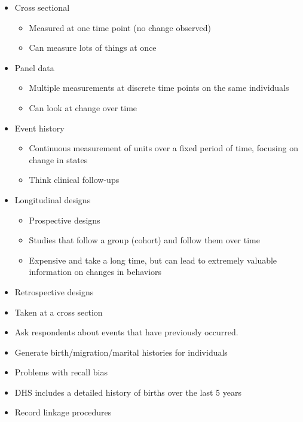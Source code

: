 \documentclass[
  letterpaper,
  DIV=11,
  numbers=noendperiod]{scrreprt}
\providecommand{\tightlist}{%
  \setlength{\itemsep}{0pt}\setlength{\parskip}{0pt}}\usepackage{longtable,booktabs,array}
\begin{document}
\begin{itemize}
\item
  Cross sectional

  \begin{itemize}
  \tightlist
  \item
    Measured at one time point (no change observed)
  \item
    Can measure lots of things at once
  \end{itemize}
\item
  Panel data

  \begin{itemize}
  \tightlist
  \item
    Multiple measurements at discrete time points on the same
    individuals
  \item
    Can look at change over time
  \end{itemize}
\item
  Event history

  \begin{itemize}
  \tightlist
  \item
    Continuous measurement of units over a fixed period of time,
    focusing on change in states
  \item
    Think clinical follow-ups
  \end{itemize}
\item
  Longitudinal designs

  \begin{itemize}
  \tightlist
  \item
    Prospective designs
  \item
    Studies that follow a group (cohort) and follow them over time
  \item
    Expensive and take a long time, but can lead to extremely valuable
    information on changes in behaviors
  \end{itemize}
\item
  Retrospective designs
\item
  Taken at a cross section
\item
  Ask respondents about events that have previously occurred.
\item
  Generate birth/migration/marital histories for individuals
\item
  Problems with recall bias
\item
  DHS includes a detailed history of births over the last 5 years
\item
  Record linkage procedures


\end{itemize}
\end{document}

